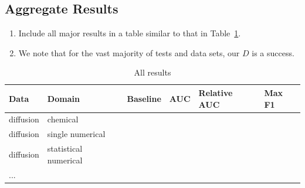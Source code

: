 \begin{enumerate}
\begin{enumerate}
    \end{enumerate}

\subsection{Aggregate Results}

\begin{enumerate}
    \item Include all major results in a table similar to that in Table~\ref{aggregate_results}.
    \item We note that for the vast majority of tests and data sets, our $D$ is a success.
\end{enumerate}

\begin{table}[H]
\begin{tabular}{|l|l|l|l|l|l|}
\hline
\textbf{Data} & \textbf{Domain}       & \textbf{Baseline} & \textbf{AUC} & \textbf{Relative AUC} & \textbf{Max F1} \\ \hline
diffusion     & chemical              &                   &              &                       &                 \\ \hline
diffusion     & single numerical      &                   &              &                       &                 \\ \hline
diffusion     & statistical numerical &                   &              &                       &                 \\ \hline
...           &                       &                   &              &                       &                 \\ \hline
\end{tabular}
\caption{All results}
\label{aggregate_results}
\end{table}

\end{enumerate}